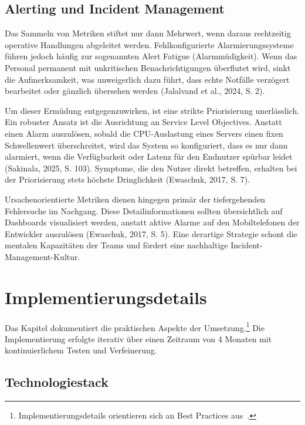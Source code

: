 \subsection{Alerting und Incident Management}

Das Sammeln von Metriken stiftet nur dann Mehrwert, wenn daraus rechtzeitig operative Handlungen abgeleitet werden. Fehlkonfigurierte Alarmierungssysteme führen jedoch häufig zur sogenannten Alert Fatigue (Alarmmüdigkeit). Wenn das Personal permanent mit unkritischen Benachrichtigungen überflutet wird, sinkt die Aufmerksamkeit, was unweigerlich dazu führt, dass echte Notfälle verzögert bearbeitet oder gänzlich übersehen werden (Jalalvand et al., 2024, S. 2).

Um dieser Ermüdung entgegenzuwirken, ist eine strikte Priorisierung unerlässlich. Ein robuster Ansatz ist die Ausrichtung an Service Level Objectives. Anstatt einen Alarm auszulösen, sobald die CPU-Auslastung eines Servers einen fixen Schwellenwert überschreitet, wird das System so konfiguriert, dass es nur dann alarmiert, wenn die Verfügbarkeit oder Latenz für den Endnutzer spürbar leidet (Sakinala, 2025, S. 103). Symptome, die den Nutzer direkt betreffen, erhalten bei der Priorisierung stets höchste Dringlichkeit (Ewaschuk, 2017, S. 7).

Ursachenorientierte Metriken dienen hingegen primär der tiefergehenden Fehlersuche im Nachgang. Diese Detailinformationen sollten übersichtlich auf Dashboards visualisiert werden, anstatt aktive Alarme auf den Mobiltelefonen der Entwickler auszulösen (Ewaschuk, 2017, S. 5). Eine derartige Strategie schont die mentalen Kapazitäten der Teams und fördert eine nachhaltige Incident-Management-Kultur.


\section{Implementierungsdetails}

Das Kapitel dokumentiert die praktischen Aspekte der Umsetzung.\footnote{Implementierungsdetails orientieren sich an Best Practices aus~\cite{martin2008clean}.}
Die Implementierung erfolgte iterativ über einen Zeitraum von 4 Monaten mit kontinuierlichem Testen und Verfeinerung.

\subsection{Technologiestack}

